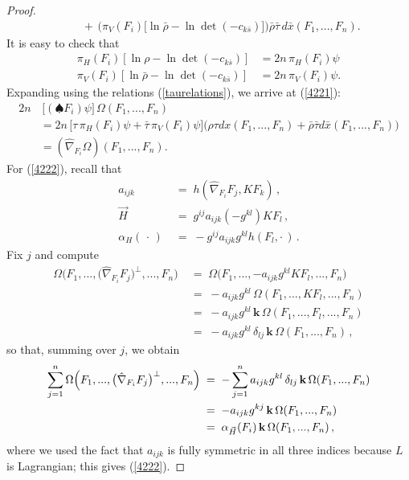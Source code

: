 \documentclass[12pt,letterpaper]{amsart}%
\numberwithin{mycounter}{section}
\theoremstyle{plain}
\numberwithin{equation}{section}
\theoremstyle{definition}
\begin{document}
\begin{proof}
\begin{align*}
& \;\;\;\;\; +\,
\Big(\pi_V(F_{i})\big[  \ln\bar{\rho}-\ln\det(-c_{k\bar{s}})\big] \Big)\bar{\rho}\bar{\tau}\, d\bar{x}(F_{1},...,F_{n}). 
\end{align*}
It is easy to check that
\begin{align*}
\pi_H(F_{i})\left[  \ln\rho-\ln\det(-c_{k\bar{s}})\right]   &  =2n\,\pi_{H}(F_{i}%
)\psi\\
\pi_V(F_{i})\left[  \ln\bar{\rho}-\ln\det(-c_{k\bar{s}})\right]   &  =2n\,\pi_{V}%
(F_{i})\psi. 
\end{align*}
Expanding using the relations (\ref{taurelations}), we arrive at (\ref{4221}):
\begin{align*}
2n&\,\big[(\spadesuit F_{i})\psi\big]\,\Omega(F_{1},...,F_{n})\\
&  =2n\,\Big[  \tau\,\pi_{H}(F_{i})\psi+\bar{\tau}
\,\pi_{V}(F_{i})\psi\Big]  \Big(
\rho\tau dx(F_{1},...,F_{n})+\bar{\rho}\bar{\tau}d\bar{x}(F_{1},...,F_{n}%
)\Big) \\
&  =(\hat{\nabla}_{F_{i}}\Omega)(F_{1},...,F_{n}).
\end{align*}
For (\ref{4222}), recall that 
    \begin{align*}
        a_{ijk} \;&=\; h(\hat{\nabla}_{F_i}F_j,KF_k) \,, \\
        \vec{H} &=\; g^{ij}a_{ijk}(-g^{kl})KF_l \,, \\ 
        \alpha_H(\,\cdot\,) \;&=\; -g^{ij}a_{ijk}g^{kl}h(F_l,\cdot\,) \,.
    \end{align*}  Fix $j$ and compute
\begin{align}
\Omega\Big(F_{1},...,\big(\hat{\nabla}_{F_{i}}F_{j}\big)^{\perp}%
,...,F_{n}\Big)\; &  =\;\Omega\Big(F_{1},...,-a_{ijk}g^{kl}KF_{l}%
,...,F_{n}\Big)\nonumber\\
\; &  =\;-a_{ijk}g^{kl}\,\Omega(F_{1},...,KF_{l},...,F_{n})\nonumber\\
\; &  =\;-a_{ijk}g^{kl}\,\mathbf{k}\,\Omega(F_{1},...,F_{l},...,F_{n}%
)\nonumber\\
\; &  =\;-a_{ijk}g^{kl}\,\delta_{lj}\,\mathbf{k}\,\Omega(F_{1},...,F_{n}%
)\,,\nonumber
\end{align}
so that, summing over $j$, we obtain
\begin{align}
\sum_{j=1}^{n}\Omega\Big(F_{1},...,\big(\hat{\nabla}_{F_{i}}F_{j}\big)^{\perp
},...,F_{n}\Big)\; &  =\;-\sum_{j=1}^{n}a_{ijk}g^{kl}\,\delta_{lj}%
\,\mathbf{k}\,\Omega(F_{1},...,F_{n})\nonumber\\
\; &  =\;-a_{ijk}g^{kj}\,\mathbf{k}\,\Omega(F_{1},...,F_{n})\nonumber\\
\; &  =\;\alpha_{\vec{H}}(F_{i})\,\text{\textbf{k}}\,\Omega(F_{1}%
,...,F_{n})\,,\label{mc form part of der Omega}%
\end{align}
where we used the fact that $a_{ijk}$ is fully symmetric in all three indices
because $L$ is Lagrangian; this gives (\ref{4222}).  



\end{proof}
\end{document}
